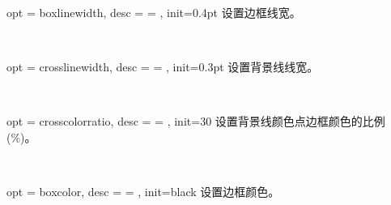 \documentclass[full]{l3doc}
\begin{document}
\begin{documentation}
\bigskip

\begin{option}{ opt = boxlinewidth, desc = {= }, init=0.4pt }
  设置边框线宽。
\end{option}\\
\begin{SideBySideExample}[frame=single,numbers=left,xrightmargin=.44\linewidth,gobble=2]
  \centering
  \quad
  \quad
\end{SideBySideExample}

\bigskip

\begin{option}{ opt = crosslinewidth, desc = {= }, init=0.3pt }
  设置背景线线宽。
\end{option}\\
\begin{SideBySideExample}[frame=single,numbers=left,xrightmargin=.44\linewidth,gobble=2]
  \centering
  \quad
  \quad
\end{SideBySideExample}

\bigskip

\begin{option}{ opt = crosscolorratio, desc = {= }, init=30 }
  设置背景线颜色点边框颜色的比例(\%)。
\end{option}\\
\begin{SideBySideExample}[frame=single,numbers=left,xrightmargin=.38\linewidth,gobble=2]
  \centering
  \quad
\end{SideBySideExample}

\bigskip

\begin{option}{ opt = boxcolor, desc = {= }, init=black }
  设置边框颜色。
\end{option}\\
\begin{SideBySideExample}[frame=single,numbers=left,xrightmargin=.50\linewidth,gobble=2]
  \centering
  \quad
  \quad
\end{SideBySideExample}


\end{documentation}
\end{document}
